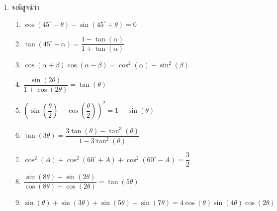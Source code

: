 \begin{enumerate}[label=\arabic*., leftmargin=*, itemsep=1em]
\begin{enumerate}[label=\theenumi\arabic*), leftmargin=1.5em, itemsep=0.6em]
		\item $\dfrac{1 + \sin \left( \theta \right)}{1 - \sin \left( \theta \right)} = \dfrac{\operatorname{cosec} \left( \theta \right) + 1}{\operatorname{cosec} \left( \theta \right) - 1}$
		\item $\operatorname{cosec} \left( x \right) - \sin \left( x \right) = \cos \left( x \right) \cot \left( x \right)$
		\item $\tan^{2} \left( \theta \right) - \sin^{2} \left( \theta \right) = \tan^{2} \left( \theta \right) \sin^{2} \left( \theta \right)$
		\item $\dfrac{\sin \left( \theta \right)}{\sin \left( \theta \right) - \cos \left( \theta \right)} = \dfrac{1}{1 - \cot \left( \theta \right)}$
		\item $\sec \left( \theta \right) - \tan \left( \theta \right) = \dfrac{\cos \left( \theta \right)}{1 + \sin \left( \theta \right)}$
	\end{enumerate}
	
	
	\item จงพิสูจน์ว่า
	\begin{enumerate}[label=\theenumi\arabic*), leftmargin=1.5em, itemsep=0.6em]
		\everymath{\displaystyle}
		\item $\cos \left( 45^{\circ} - \theta \right) - \sin \left( 45^{\circ} + \theta \right) = 0$
		\item $\tan \left( 45^{\circ} - \alpha \right) = \dfrac{1 - \tan \left( \alpha \right)}{1 + \tan \left( \alpha \right)}$
		\item $\cos \left( \alpha + \beta \right) \cos \left( \alpha - \beta \right) = \cos^{2} \left( \alpha \right) - \sin^{2} \left( \beta \right)$
		\item $\dfrac{\sin \left( 2\theta \right)}{1 + \cos \left( 2\theta \right)} = \tan \left( \theta \right)$
		\item $\left( \sin \left( \dfrac{\theta}{2} \right) - \cos \left( \dfrac{\theta}{2} \right) \right)^{2} = 1 - \sin \left( \theta \right)$
		\item $\tan \left( 3\theta \right) = \dfrac{3 \tan \left( \theta \right) - \tan^{3} \left( \theta \right)}{1 - 3 \tan^{2} \left( \theta \right)}$
		\item $\cos^{2} \left( A \right) + \cos^{2} \left( 60^{\circ} + A \right) + \cos^{2} \left( 60^{\circ} - A \right) = \dfrac{3}{2}$
		\item $\dfrac{\sin \left( 8\theta \right) + \sin \left( 2\theta \right)}{\cos \left( 8\theta \right) + \cos \left( 2\theta \right)} = \tan \left( 5\theta \right)$
		\item $\sin \left( \theta \right) + \sin \left( 3\theta \right) + \sin \left( 5\theta \right) + \sin \left( 7\theta \right) = 4 \cos \left( \theta \right) \sin \left( 4\theta \right) \cos \left( 2\theta \right)$
	\end{enumerate}
	

\end{enumerate}
